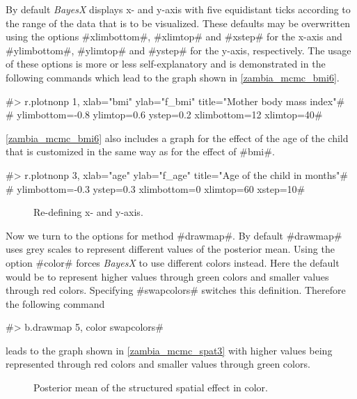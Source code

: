 \documentclass[11pt,a4paper,twoside]{bayesxreport}
\begin{document}
By default {\it BayesX} displays x- and y-axis with five equidistant
ticks according to the range of the data that is to be visualized.
These defaults may be overwritten using the options #xlimbottom#,
#xlimtop# and #xstep# for the x-axis and #ylimbottom#, #ylimtop# and
#ystep# for the y-axis, respectively. The usage of these options is
more or less self-explanatory and is demonstrated in the following
commands which lead to the graph shown in
\autoref{zambia_mcmc_bmi6}.

#> r.plotnonp 1, xlab="bmi" ylab="f_bmi" title="Mother body mass index"#\\
#  ylimbottom=-0.8 ylimtop=0.6 ystep=0.2 xlimbottom=12 xlimtop=40#

\autoref{zambia_mcmc_bmi6} also includes a graph for the effect of
the age of the child that is customized in the same way as for the
effect of #bmi#.

#> r.plotnonp 3, xlab="age" ylab="f_age" title="Age of the child in months"#\\
#  ylimbottom=-0.3  ystep=0.3 xlimbottom=0 xlimtop=60 xstep=10#

\begin{figure}[ht]
\begin{center}
{\it\caption{Re-defining x- and y-axis.\label{zambia_mcmc_bmi6}}}
\end{center}
\end{figure}

Now we turn to the options for method #drawmap#. By default
#drawmap# uses grey scales to represent different values of the
posterior mean. Using the option #color# forces {\it BayesX} to use
different colors instead. Here the default would be to represent
higher values through green colors and smaller values through red
colors. Specifying #swapcolors# switches this definition. Therefore
the following command

#> b.drawmap 5, color swapcolors#

leads to the graph shown in \autoref{zambia_mcmc_spat3} with higher
values being represented through red colors and smaller values
through green colors.

\begin{figure}[ht]
\begin{center}
{\it\caption{Posterior mean of the structured spatial effect in
color.\label{zambia_mcmc_spat3}}}
\end{center}
\end{figure}
\end{document}
